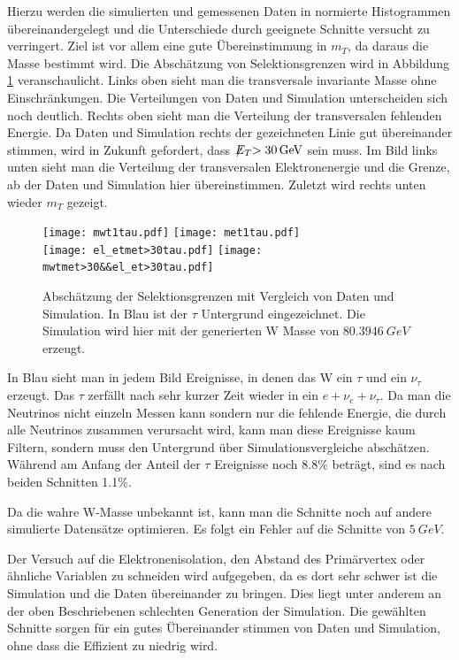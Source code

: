 \documentclass[a4paper,12pt]{article}
\newcommand{\met}{\ensuremath{\not\mathrel{E}}_T}
\begin{document}
Hierzu werden die simulierten und gemessenen Daten in normierte Histogrammen übereinandergelegt
und die Unterschiede durch geeignete Schnitte versucht zu verringert. Ziel ist vor allem eine gute
Übereinstimmung in $m_T$, da daraus die Masse bestimmt wird. Die Abschätzung von Selektionsgrenzen
wird in Abbildung \ref{fig:abschaetzung} veranschaulicht. Links oben sieht man die transversale
invariante Masse ohne Einschränkungen. Die Verteilungen von Daten und Simulation unterscheiden sich
noch deutlich. Rechts oben sieht man die Verteilung der transversalen
fehlenden Energie. Da Daten und Simulation rechts der gezeichneten Linie gut übereinander stimmen,
wird in Zukunft gefordert, dass $\met > \SI{30}{GeV}$ sein muss. Im Bild links unten sieht man die
Verteilung der transversalen Elektronenergie und die Grenze, ab der Daten und Simulation hier
übereinstimmen. Zuletzt wird rechts unten wieder $m_T$ gezeigt.

\begin{figure}[h]
	\centering
	\texttt{[image: mwt1tau.pdf]}
	\texttt{[image: met1tau.pdf]}\\
	\texttt{[image: el\_etmet>30tau.pdf]}
	\texttt{[image: mwtmet>30\&\&el\_et>30tau.pdf]}
	\caption{Abschätzung der Selektionsgrenzen mit Vergleich von Daten und Simulation. In Blau ist
	der $τ$ Untergrund eingezeichnet. Die Simulation wird hier mit der generierten W Masse von
	$\SI{80.3946}{GeV}$ erzeugt.}
	\label{fig:abschaetzung}
\end{figure}

In Blau sieht man in jedem Bild Ereignisse, in denen das W ein $τ$ und ein $ν_τ$ erzeugt. Das $τ$
zerfällt nach sehr kurzer Zeit wieder in ein $e + ν_e + ν_τ$. Da man die Neutrinos nicht einzeln
Messen kann sondern nur die fehlende Energie, die durch alle Neutrinos zusammen verursacht wird,
kann man diese Ereignisse kaum Filtern, sondern muss den Untergrund über Simulationsvergleiche
abschätzen. Während am Anfang der Anteil der $τ$ Ereignisse noch 8.8\% beträgt, sind es nach beiden
Schnitten 1.1\%.

Da die wahre W-Masse unbekannt ist, kann man die Schnitte noch auf andere simulierte Datensätze
optimieren. Es folgt ein Fehler auf die Schnitte von $\SI{5}{GeV}$.

Der Versuch auf die Elektronenisolation, den Abstand des Primärvertex oder ähnliche Variablen zu
schneiden wird aufgegeben, da es dort sehr schwer ist die Simulation und die Daten übereinander zu
bringen. Dies liegt unter anderem an der oben Beschriebenen schlechten Generation der Simulation.
Die gewählten Schnitte sorgen für ein gutes Übereinander stimmen von Daten und Simulation, ohne dass
die Effizient zu niedrig wird.
\end{document}
